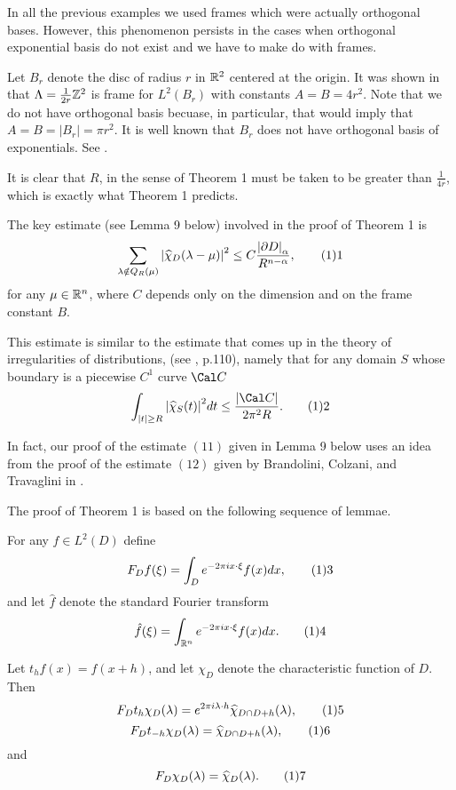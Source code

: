In all the previous examples we used frames which were actually orthogonal 
bases. However, this phenomenon persists in the cases when orthogonal 
exponential basis do not exist and we have to make do with frames. 

 Let $B_r$ denote the disc of radius $r$ in ${\Bbb R}^2$
centered at the origin. It was shown in \cite{JP2} that 
$\Lambda=\frac{1}{2r} {\Bbb Z}^2$ is frame for $L^2(B_r)$ with constants 
$A=B=4r^2$. Note that we do not have orthogonal basis becuase, in particular,
that would imply that $A=B=|B_r|=\pi r^2$. It is well known that $B_r$ 
does not have orthogonal basis of exponentials. See \cite{Fug}. 

It is clear that $R$, in the sense of Theorem 1 must be taken to be 
greater than $\frac{1}{4r}$, which is exactly what Theorem 1 predicts. 
\endproclaim 

The key estimate (see Lemma 9 below) involved in the proof of Theorem 1 is
$$ \sum_{\lambda \notin Q_R(\mu)} {|\widehat{\chi}_D(\lambda-\mu)|}^2 \leq 
C\frac{{|\partial D|}_{\alpha}}{R^{n-\alpha}}, \tag11$$ for any 
$\mu \in {\Bbb R}^n$, where $C$ depends only on the dimension and 
on the frame constant $B$. 

This estimate is similar to the estimate that comes up in the theory of 
irregularities of distributions, (see \cite{Mgr}, p.110),  namely that for any 
domain $S$ whose boundary is a piecewise $C^1$ curve ${\Cal C}$ 
$$ \int_{|t| \ge R} {|\widehat{\chi}_S(t)|}^2 dt \leq \frac{|{\Cal C}|}
{2 \pi^2 R}. \tag12$$ 

In fact, our proof of the estimate $(11)$ given in Lemma 9 below uses an idea 
from the proof of the estimate $(12)$ given by Brandolini, Colzani, and 
Travaglini in \cite{BCT}.  

The proof of Theorem 1 is based on the following sequence of lemmae. 

 For any $f \in L^2(D)$ define 
$$ F_Df(\xi)=\int_D e^{-2\pi ix \cdot \xi} f(x)dx, \tag13$$ and let
$\hat{f}$ denote the standard Fourier transform 
$$ \hat{f}(\xi)=\int_{{\Bbb R}^n} e^{-2\pi i x \cdot \xi} f(x)dx. \tag14$$ 

Let $t_hf(x)=f(x+h)$, and let $\chi_D$ denote the characteristic function of 
$D$. Then 
$$ F_Dt_h \chi_{D}(\lambda) =e^{2\pi i \lambda \cdot h} 
\widehat{\chi}_{D \cap D+h}(\lambda), \tag15$$ 
$$ F_D t_{-h}\chi_D(\lambda)=\widehat{\chi}_{D \cap D+h}(\lambda), \tag16$$ and
$$ F_D\chi_D(\lambda)=\widehat{\chi}_D(\lambda). \tag17$$ 
\endproclaim 

